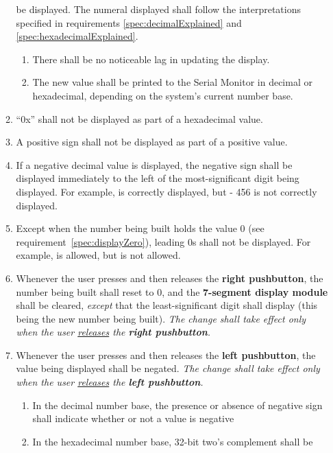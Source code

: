 \begin{enumerate}
\begin{enumerate}
        be displayed. The numeral displayed shall follow the interpretations
        specified in requirements \ref{spec:decimalExplained} and
        \ref{spec:hexadecimalExplained}.
        \begin{enumerate}
        \item There shall be no noticeable lag in updating the display.
        \item \label{spec:printValueToConsole} The new value shall be printed
            to the Serial Monitor in decimal or hexadecimal, depending on the
            system's current number base.
        \end{enumerate}
    \item ``0x'' shall not be displayed as part of a hexadecimal value.
    \item A positive sign shall not be displayed as part of a positive value.
    \item If a negative decimal value is displayed, the negative sign shall
        be displayed immediately to the left of the most-significant digit
        being displayed. For example, {} is correctly
        displayed, but {\dviiseg -    456} is not correctly displayed.
    \item \label{spec:noLeadingZeroes} Except when the number being built holds
        the value 0 (see requirement~\ref{spec:displayZero}), leading 0s shall not
        be displayed. For example, {} is allowed, but {} is not allowed.
    \item Whenever the user presses and then releases the \textbf{right
        pushbutton}, the number being built shall reset to 0, and the
        \textbf{7-segment display module} shall be cleared, \textit{except} that
        the least-significant digit shall display {} (this being the
        new number being built). \textit{The change shall take effect only when
        the user \underline{releases} the \textbf{right pushbutton}.}
    \item Whenever the user presses and then releases the \textbf{left
        pushbutton}, the value being displayed shall be negated. \textit{The
        change shall take effect only when the user \underline{releases} the
        \textbf{left pushbutton}.}
        \begin{enumerate}
        \item In the decimal number base, the presence or absence of negative
            sign shall indicate whether or not a value is negative
        \item In the hexadecimal number base, 32-bit two's complement shall be

\end{enumerate}
\end{enumerate}
\end{enumerate}
